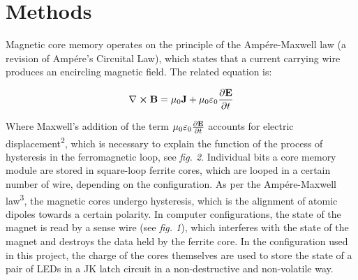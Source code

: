 \documentclass{article}
\begin{document}
\clearpage\newpage\section{Methods}
Magnetic core memory operates on the principle of the Amp\'ere-Maxwell law (a revision of Amp\'ere's Circuital Law), which states that a current carrying wire produces an encircling magnetic field. The related equation is:

\[ \nabla \cross \vb{B} = \mu_0\vb{J} + \mu_0\varepsilon_0 \frac{\partial\vb{E}}{\partial t} \]

\noindent Where Maxwell's addition of the term $\mu_0\varepsilon_0 \frac{\partial\vb{E}}{\partial t}$ accounts for electric displacement\textsuperscript{2}, which is necessary to explain the function of the process of hysteresis in the ferromagnetic loop, see \emph{fig. 2}. Individual bits a core memory module are stored in square-loop ferrite cores, which are looped in a certain number of wire, depending on the configuration. As per the Amp\'ere-Maxwell law\textsuperscript{3}, the magnetic cores undergo hysteresis, which is the alignment of atomic dipoles towards a certain polarity. In computer configurations, the state of the magnet is read by a sense wire (see \emph{fig. 1}), which interferes with the state of the magnet and destroys the data held by the ferrite core. In the configuration used in this project, the charge of the cores themselves are used to store the state of a pair of LEDs in a JK latch circuit in a non-destructive and non-volatile way.
\end{document}
